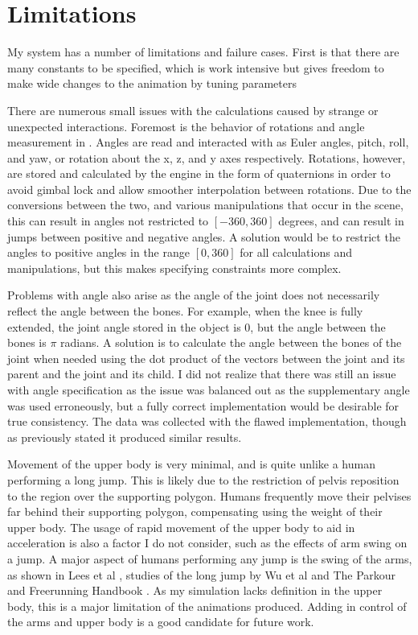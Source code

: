 

\section{Limitations}
\label{section:limitations}
My system has a number of limitations and failure cases.  First is that there are many constants to be specified, which is work intensive but gives freedom to make wide changes to the animation by tuning parameters

There are numerous small issues with the calculations caused by strange or unexpected interactions.  Foremost is the behavior of rotations and angle measurement in \unity{}.  Angles are read and interacted with as Euler angles, pitch, roll, and yaw, or rotation about the x, z, and y axes respectively.  Rotations, however, are stored and calculated by the engine in the form of quaternions in order to avoid gimbal lock and allow smoother interpolation between rotations.  Due to the conversions between the two, and various manipulations that occur in the scene, this can result in angles not restricted to $[-360, 360]$ degrees, and can result in jumps between positive and negative angles.  A solution would be to restrict the angles to positive angles in the range $[0,360]$ for all calculations and manipulations, but this makes specifying constraints more complex.  

Problems with angle also arise as the angle of the joint does not necessarily reflect the angle between the bones.  For example, when the knee is fully extended, the joint angle stored in the object is 0, but the angle between the bones is $\pi$ radians.  A solution is to calculate the angle between the bones of the joint when needed using the dot product of the vectors between the joint and its parent and the joint and its child.  I did not realize that there was still an issue with angle specification as the issue was balanced out as the supplementary angle was used erroneously, but a fully correct implementation would be desirable for true consistency.  The data was collected with the flawed implementation, though as previously stated it produced similar results.

Movement of the upper body is very minimal, and is quite unlike a human performing a long jump.  This is likely due to the restriction of pelvis reposition to the region over the supporting polygon.  Humans frequently move their pelvises far behind their supporting polygon, compensating using the weight of their upper body.  The usage of rapid movement of the upper body to aid in acceleration is also a factor I do not consider, such as the effects of arm swing on a jump.  A major aspect of humans performing any jump is the swing of the arms, as shown in Lees et al \cite{lees_arm_swing}, studies of the long jump by Wu et al \cite{longjump} and The Parkour and Freerunning Handbook \cite{parkour}.  As my simulation lacks definition in the upper body, this is a major limitation of the animations produced.  Adding in control of the arms and upper body is a good candidate for future work.

